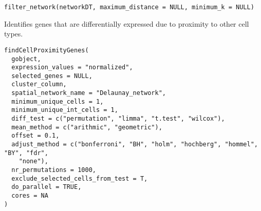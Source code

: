 \documentclass[a4paper]{book}
\begin{document}
%
\begin{Usage}
\begin{verbatim}
filter_network(networkDT, maximum_distance = NULL, minimum_k = NULL)
\end{verbatim}
\end{Usage}
%
\begin{Description}\relax
Identifies genes that are differentially expressed due to proximity to other cell types.
\end{Description}
%
\begin{Usage}
\begin{verbatim}
findCellProximityGenes(
  gobject,
  expression_values = "normalized",
  selected_genes = NULL,
  cluster_column,
  spatial_network_name = "Delaunay_network",
  minimum_unique_cells = 1,
  minimum_unique_int_cells = 1,
  diff_test = c("permutation", "limma", "t.test", "wilcox"),
  mean_method = c("arithmic", "geometric"),
  offset = 0.1,
  adjust_method = c("bonferroni", "BH", "holm", "hochberg", "hommel", "BY", "fdr",
    "none"),
  nr_permutations = 1000,
  exclude_selected_cells_from_test = T,
  do_parallel = TRUE,
  cores = NA
)
\end{verbatim}
\end{Usage}
%
\end{document}
